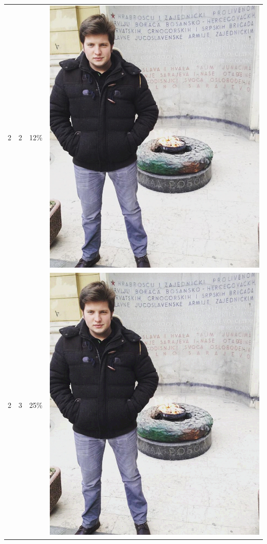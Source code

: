 \documentclass[times, utf8, seminar, numeric]{fer}
\begin{document}
\begin{center}
\begin{longtable}{|c|c|c|c|}
2 & 2 &12\% & \includegraphics[scale=0.3]{../benchmark_results/pattern/2_components-2_bits.png} \\
2 & 3 &25\% & \includegraphics[scale=0.3]{../benchmark_results/pattern/2_components-3_bits.png} \\

\end{longtable}
\end{center}
\end{document}
